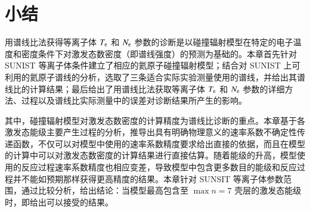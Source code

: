 \section{小结}

用谱线比法获得等离子体 $T_{\rm e}$ 和 $N_{\rm e}$ 参数的诊断是以碰撞辐射模型在特定的电子温度和密度条件下对激发态数密度（即谱线强度）的预测为基础的。本章首先针对 SUNIST 等离子体条件建立了相应的氦原子碰撞辐射模型；结合对 SUNIST 上可利用的氦原子谱线的分析，选取了三条适合实际实验测量使用的谱线，并给出其谱线比的计算结果；最后给出了用谱线比法获取等离子体 $T_{\rm e}$ 和 $N_{\rm e}$ 参数的详细方法、过程以及谱线比实际测量中的误差对诊断结果所产生的影响。

其中，碰撞辐射模型对激发态数密度的计算精度为谱线比诊断的重点。本章基于各激发态能级主要产生过程的分析，推导出具有明确物理意义的速率系数不确定性传递函数，不仅可以对模型中使用的速率系数精度要求给出直接的依据，而且在模型的计算中可以对激发态数密度的计算结果进行直接估算。随着能级的升高，模型使用的反应过程速率系数精度也相应变差，导致模型中包含更多数目的能级和反应过程并不能如预期那样获得更高精度的结果。本章针对 SUNSIT 等离子体参数范围，通过比较分析，给出结论：当模型最高包含至 $\max n=7$ 壳层的激发态能级时，即给出可以接受的结果。

